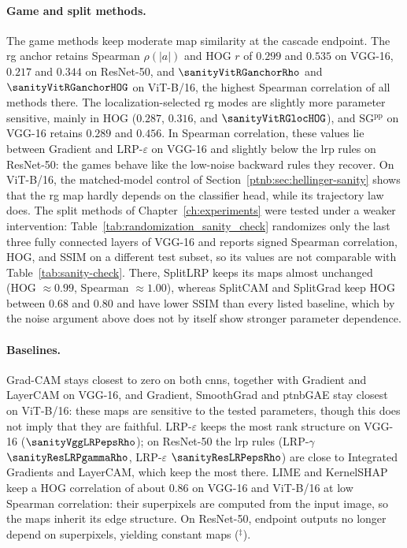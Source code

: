 

\paragraph{Game and split methods.}
The game methods keep moderate map similarity at the cascade endpoint. The \ac{rg} anchor retains Spearman $\rho(|a|)$ and HOG $r$ of $0.299$ and $0.535$ on VGG-16, $0.217$ and $0.344$ on ResNet-50, and $\sanityVitRGanchorRho$ and $\sanityVitRGanchorHOG$ on ViT-B/16, the highest Spearman correlation of all methods there. The localization-selected \ac{rg} modes are slightly more parameter sensitive, mainly in HOG ($0.287$, $0.316$, and $\sanityVitRGlocHOG$), and SG$^{\mathrm{pp}}$ on VGG-16 retains $0.289$ and $0.456$. In Spearman correlation, these values lie between Gradient and LRP-$\varepsilon$ on VGG-16 and slightly below the \ac{lrp} rules on ResNet-50: the games behave like the low-noise backward rules they recover. On ViT-B/16, the matched-model control of Section~\ref{ptnb:sec:hellinger-sanity} shows that the \ac{rg} map hardly depends on the classifier head, while its trajectory law does. The split methods of Chapter~\ref{ch:experiments} were tested under a weaker intervention: Table~\ref{tab:randomization_sanity_check} randomizes only the last three fully connected layers of VGG-16 and reports signed Spearman correlation, HOG, and SSIM on a different test subset, so its values are not comparable with Table~\ref{tab:sanity-check}. There, SplitLRP keeps its maps almost unchanged (HOG $\approx0.99$, Spearman $\approx1.00$), whereas SplitCAM and SplitGrad keep HOG between $0.68$ and $0.80$ and have lower SSIM than every listed baseline, which by the noise argument above does not by itself show stronger parameter dependence.

\paragraph{Baselines.}
Grad-CAM stays closest to zero on both \acp{cnn}, together with Gradient and LayerCAM on VGG-16, and Gradient, SmoothGrad and \ac{ptnbGAE} stay closest on ViT-B/16: these maps are sensitive to the tested parameters, though this does not imply that they are faithful. LRP-$\varepsilon$ keeps the most rank structure on VGG-16 ($\sanityVggLRPepsRho$); on ResNet-50 the \ac{lrp} rules (LRP-$\gamma$ $\sanityResLRPgammaRho$, LRP-$\varepsilon$ $\sanityResLRPepsRho$) are close to Integrated Gradients and LayerCAM, which keep the most there. LIME and KernelSHAP keep a HOG correlation of about $0.86$ on VGG-16 and ViT-B/16 at low Spearman correlation: their superpixels are computed from the input image, so the maps inherit its edge structure. On ResNet-50, endpoint outputs no longer depend on superpixels, yielding constant maps ($^{\ddagger}$).


